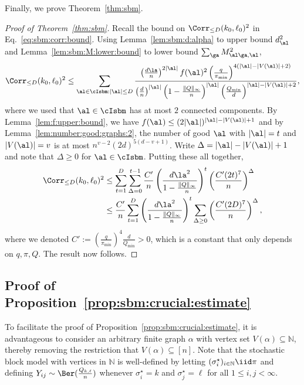 \documentclass[11pt]{article}
\begin{document}
Finally, we prove Theorem~\ref{thm:sbm}.
\begin{proof}[Proof of Theorem~\ref{thm:sbm}]
Recall the bound on $\Corr_{\leq D}(k_0,\ell_0)^2$ in Eq.~\eqref{eq:sbm:corr:bound}. Using Lemma~\ref{lem:sbm:d:alpha} to upper bound $d_{\al}^2$ and Lemma~\ref{lem:sbm:M:lower:bound} to lower bound $\sum_{\ga}M_{\al\ga,\al}^2$,
\[
\Corr_{\leq D}(k_0,\ell_0)^2\leq \sum_{\al\in \cIsbm:|\al|\leq D} \frac{\left(\frac{d\la}{n}\right)^{2|\al|}f(\al)^2 \left(\frac{q}{\pi_{\min}}\right)^{4(|\al|-|V(\al)|+2)}}{\left(\frac{d}{n}\right)^{|\al|}\left(1-\frac{\|Q\|_{\infty}}{n}\right)^{|\al|} \left(\frac{Q_{\min}}{d}\right)^{|\al|-|V(\al)|+2}},
\]
where we used that $\al\in \cIsbm$ has at most $2$ connected components. By Lemma~\ref{lem:f:upper:bound}, we have $f(\al)\leq (2|\al|)^{|\al|-|V(\al)|+1}$ and by Lemma~\ref{lem:number:good:graphs:2}, the number of good $\al$ with $|\al|=t$ and $|V(\al)|=v$ is at most $n^{v-2}(2d)^{5(d-v+1)}$. Write $\Delta=|\al|-|V(\al)|+1$ and note that $\Delta\geq 0$ for $\al\in \cIsbm$. Putting these all together,
\[
\begin{split}
\Corr_{\leq D}(k_0,\ell_0)^2
&\leq \sum_{t=1}^{D}\sum_{\Delta=0}^{t-1} \frac{C'}{n}\left(\frac{d \la^2}{1-\frac{\|Q\|_{\infty}}{n}}\right)^t \left(\frac{C'(2t)^7}{n}\right)^{\Delta}\\
&\leq \frac{C'}{n}\sum_{t=1}^{D}\left(\frac{d \la^2}{1-\frac{\|Q\|_{\infty}}{n}}\right)^t \sum_{\Delta\geq 0}\left(\frac{C'(2D)^7}{n}\right)^{\Delta},
\end{split}
\]
where we denoted $C':=\left(\frac{q}{\pi_{\min}}\right)^4\frac{d}{Q_{\min}}>0$, which is a constant that only depends on $q,\pi,Q$. The result now follows.
\end{proof}


\subsection{Proof of Proposition~\ref{prop:sbm:crucial:estimate}}
 \label{subsec:prop:sbm:crucial:estimate}
To facilitate the proof of Proposition~\ref{prop:sbm:crucial:estimate}, it is advantageous to consider an arbitrary finite graph $\alpha$ with vertex set $V(\alpha) \subseteq \mathbb{N}$, thereby removing the restriction that $V(\alpha) \subseteq [n]$. Note that the stochastic block model with vertices in $\mathbb{N}$ is well-defined by letting $(\sigma^\star_i)_{i \in \mathbb{N}}\iid \pi$ and defining $Y_{ij}\sim \Ber(\frac{Q_{k,\ell}}{n})$ whenever $\sigma^\star_i=k$ and $\sigma^\star_j=\ell$ for all $1 \le i,j < \infty$.
 
\end{document}
